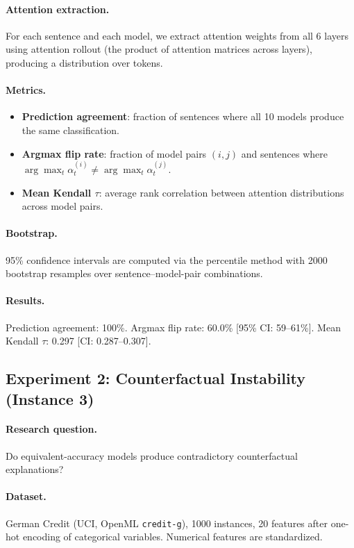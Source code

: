 \documentclass[11pt,a4paper]{article}
\begin{document}
\paragraph{Attention extraction.}
For each sentence and each model, we extract attention weights from all 6 layers
using attention rollout (the product of attention matrices across layers),
producing a distribution over tokens.

\paragraph{Metrics.}
\begin{itemize}[nosep]
  \item \textbf{Prediction agreement}: fraction of sentences where all 10 models
    produce the same classification.
  \item \textbf{Argmax flip rate}: fraction of model pairs $(i,j)$ and sentences
    where $\arg\max_t \alpha^{(i)}_t \neq \arg\max_t \alpha^{(j)}_t$.
  \item \textbf{Mean Kendall $\tau$}: average rank correlation between attention
    distributions across model pairs.
\end{itemize}

\paragraph{Bootstrap.}
95\% confidence intervals are computed via the percentile method with 2000
bootstrap resamples over sentence--model-pair combinations.

\paragraph{Results.}
Prediction agreement: 100\%.  Argmax flip rate: 60.0\% [95\% CI: 59--61\%].
Mean Kendall $\tau$: 0.297 [CI: 0.287--0.307].

\subsection{Experiment 2: Counterfactual Instability (Instance 3)}
\label{app:exp-counterfactual}

\paragraph{Research question.}
Do equivalent-accuracy models produce contradictory counterfactual explanations?

\paragraph{Dataset.}
German Credit (UCI, OpenML \texttt{credit-g}), 1000 instances, 20 features
after one-hot encoding of categorical variables.  Numerical features are
standardized.
\end{document}
